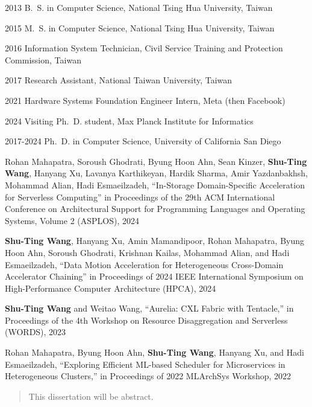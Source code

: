 \begin{frontmatter}
%
%
\begin{vitapage}
\begin{vita}
  \item[2013] B.~S. in Computer Science, National Tsing Hua University, Taiwan
  \item[2015] M.~S. in Computer Science, National Tsing Hua University, Taiwan
  \item[2016] Information System Technician, Civil Service Training and Protection Commission, Taiwan 
  \item[2017] Research Assistant, National Taiwan University, Taiwan
  \item[2021] Hardware Systems Foundation Engineer Intern, Meta (then Facebook)
  \item[2024] Visiting Ph.~D. student, Max Planck Institute for Informatics
  \item[2017-2024] Ph.~D. in Computer Science, University of California San Diego
\end{vita}
\begin{publications}
  \item Rohan Mahapatra, Soroush Ghodrati, Byung Hoon Ahn, Sean Kinzer, \textbf{Shu-Ting Wang}, Hanyang Xu,  Lavanya Karthikeyan, Hardik Sharma,  Amir Yazdanbakhsh,  Mohammad Alian, Hadi Esmaeilzadeh, “In-Storage Domain-Specific Acceleration for Serverless Computing” in Proceedings of the 29th ACM International Conference on Architectural Support for Programming Languages and Operating Systems, Volume 2 (ASPLOS), 2024
  \item \textbf{Shu-Ting Wang}, Hanyang Xu, Amin Mamandipoor, Rohan Mahapatra, Byung Hoon Ahn, Soroush Ghodrati, Krishnan Kailas, Mohammad Alian, and Hadi Esmaeilzadeh, “Data Motion Acceleration for Heterogeneous Cross-Domain Accelerator Chaining” in Proceedings of 2024 IEEE International Symposium on High-Performance Computer Architecture (HPCA), 2024
  \item \textbf{Shu-Ting Wang} and Weitao Wang, “Aurelia: CXL Fabric with Tentacle,” in Proceedings of the 4th Workshop on Resource Disaggregation and Serverless (WORDS), 2023
  \item Rohan Mahapatra, Byung Hoon Ahn, \textbf{Shu-Ting Wang}, Hanyang Xu, and Hadi Esmaeilzadeh, “Exploring Eﬀicient ML-based Scheduler for Microservices in Heterogeneous Clusters,” in Proceedings of 2022 MLArchSys Workshop, 2022
\end{publications}
\end{vitapage}


%
%
\begin{abstract}
  This dissertation will be abstract.
\end{abstract}


\end{frontmatter}
